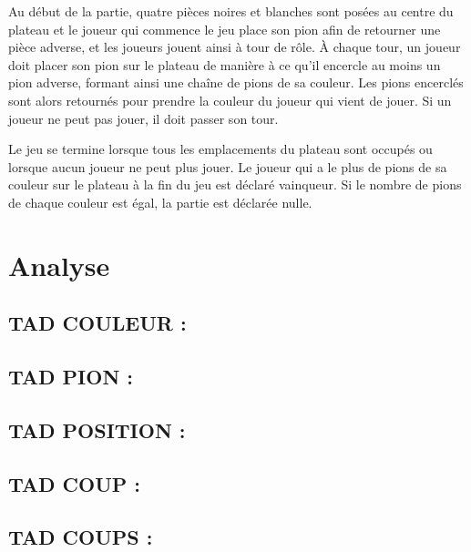 \documentclass{article}
\begin{document}
\vspace{5mm}

Au début de la partie, quatre pièces noires et blanches sont posées au centre du plateau et le joueur qui commence le jeu place son pion afin de retourner une pièce adverse, et les joueurs jouent ainsi à tour de rôle. À chaque tour, un joueur doit placer son pion sur le plateau de manière à ce qu'il encercle au moins un pion adverse, formant ainsi une chaîne de pions de sa couleur. Les pions encerclés sont alors retournés pour prendre la couleur du joueur qui vient de jouer. Si un joueur ne peut pas jouer, il doit passer son tour.

\vspace{5mm}

Le jeu se termine lorsque tous les emplacements du plateau sont occupés ou lorsque aucun joueur ne peut plus jouer. Le joueur qui a le plus de pions de sa couleur sur le plateau à la fin du jeu est déclaré vainqueur. Si le nombre de pions de chaque couleur est égal, la partie est déclarée nulle.

\newpage

\section{Analyse}

\subsection{TAD COULEUR :}


\subsection{TAD PION :}


\subsection{TAD POSITION :}


\subsection{TAD COUP :}


\subsection{TAD COUPS :}

\end{document}

